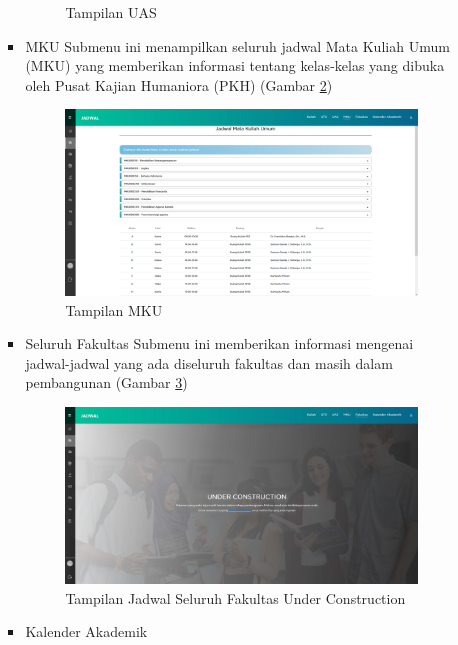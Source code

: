 \begin{enumerate}
\begin{itemize}
\begin{itemize}
\begin{figure}[H]
			\caption{Tampilan UAS}
			\label{fig:studentportal_uas}
			\end{figure}
			\item MKU
			Submenu ini menampilkan seluruh jadwal Mata Kuliah Umum (MKU) yang memberikan informasi tentang kelas-kelas yang dibuka oleh Pusat Kajian Humaniora (PKH) (Gambar \ref{fig:studentportal_jadwal_mku})
			\begin{figure}[H]
			\centering
			\includegraphics[scale=0.23]{Gambar/studentportal_jadwal_mku}
			\caption{Tampilan MKU}
			\label{fig:studentportal_jadwal_mku}
			\end{figure}
			\item Seluruh Fakultas
			Submenu ini memberikan informasi mengenai jadwal-jadwal yang ada diseluruh fakultas dan masih dalam pembangunan (Gambar \ref{fig:studentportal_jadwal_seluruh_fakultas})
			\begin{figure}[H]
			\centering
			\includegraphics[scale=0.3]{Gambar/studentportal_seluruh_fakultas_under_construction}
			\caption{Tampilan Jadwal Seluruh Fakultas Under Construction}
			\label{fig:studentportal_jadwal_seluruh_fakultas}
			\end{figure}
			\item Kalender Akademik

\end{itemize}
\end{itemize}
\end{enumerate}
